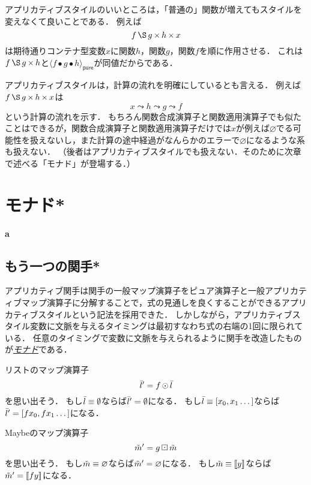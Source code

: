 \documentclass[twocolumn]{jsbook}
\def\[{[\![}
\def\]{]\!]}
\newcommand{\keyword}[1]{\underline{\emph{#1}}}
\newenvironment{leader}{\begingroup\bf}{\endgroup}
\DeclareMathOperator{\hsklApplicativeApply}{\S}
\DeclareMathOperator{\hsklApplicativeMap}{\times}
\DeclareMathOperator{\hsklMap}{\odot}
\DeclareMathOperator{\hsklMaybeMap}{\boxdot}
\newcommand{\hsklEmptyList}{\emptyset}
\newcommand{\hsklNothing}{\varnothing}
\newcommand{\hsklJust}[1]{\[#1\]}
\newcommand{\hsklList}[1]{\Bar{#1}}
\newcommand{\hsklMaybe}[1]{\Tilde{#1}}
\newcommand{\hsklPure}[1]{\langle#1\rangle_\textsf{pure}}
\DeclareMathOperator{\mathCompose}{\bullet}
\begin{document}
アプリカティブスタイルのいいところは，「普通の」関数が増えてもスタイルを変えなくて良いことである．
例えば$$f\hsklApplicativeApply g\hsklApplicativeMap h\hsklApplicativeMap x$$は期待通りコンテナ型変数$x$に関数$h$，関数$g$，関数$f$を順に作用させる．
これは$f\hsklApplicativeApply g\hsklApplicativeMap h$と$\hsklPure{f\mathCompose g\mathCompose h}$が同値だからである．

アプリカティブスタイルは，計算の流れを明確にしているとも言える．
例えば$f\hsklApplicativeApply g\hsklApplicativeMap h\hsklApplicativeMap x$は$$x\leadsto h\leadsto g\leadsto f$$という計算の流れを示す．
もちろん関数合成演算子と関数適用演算子でも似たことはできるが，関数合成演算子と関数適用演算子だけでは$x$が例えば$\hsklNothing$でる可能性を扱えないし，また計算の途中経過がなんらかのエラーで$\hsklNothing$になるような系も扱えない．
（後者はアプリカティブスタイルでも扱えない．そのために次章で述べる「モナド」が登場する．）


\chapter{モナド*}


\begin{leader}
a
\end{leader}


\section{もう一つの関手*}

アプリカティブ関手は関手の一般マップ演算子をピュア演算子と一般アプリカティブマップ演算子に分解することで，式の見通しを良くすることができるアプリカティブスタイルという記法を採用できた．
しかしながら，アプリカティブスタイル変数に文脈を与えるタイミングは最初すなわち式の右端の1回に限られている．
任意のタイミングで変数に文脈を与えられるように関手を改造したものが\keyword{モナド}である．

リストのマップ演算子$$\hsklList{l}'=f\hsklMap\hsklList{l}$$を思い出そう．
もし$\hsklList{l}\equiv\hsklEmptyList$ならば$\hsklList{l}'=\hsklEmptyList$になる．
もし$\hsklList{l}\equiv[x_0,x_1\dots]$ならば$\hsklList{l}'=[fx_0,fx_1\dots]$になる．

Maybeのマップ演算子$$\hsklMaybe{m}'=g\hsklMaybeMap\hsklMaybe{m}$$を思い出そう．
もし$\hsklMaybe{m}\equiv\hsklNothing$ならば$\hsklMaybe{m}'=\hsklNothing$になる．
もし$\hsklMaybe{m}\equiv\hsklJust{y}$ならば$\hsklMaybe{m}'=\hsklJust{fy}$になる．
\end{document}
